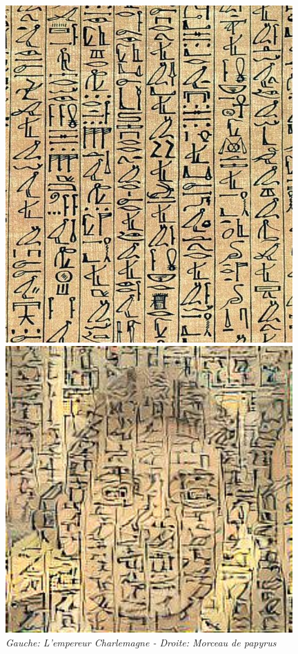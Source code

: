 \documentclass{article}
\begin{document}
\begin{figure}[!htb]
\begin{minipage}{0.25\textwidth}
\includegraphics[width=0.98\textwidth]{../Images/papyrus.jpg}
\end{minipage}%
\begin{minipage}{0.25\textwidth}
\centering
\includegraphics[width=0.98\textwidth]{../Images/transfer/tdf_papyrus.jpg}
\end{minipage}
\caption{\textit{Gauche: L'empereur Charlemagne - Droite: Morceau de papyrus}}
\label{fig:set_5}
\end{figure}
\end{document}

